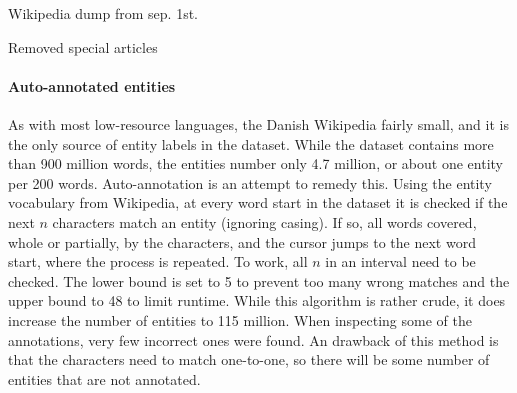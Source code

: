 \documentclass[10pt, a4paper]{article}
\begin{document}
Wikipedia dump from sep. 1st.

Removed special articles

\paragraph{Auto-annotated entities}
As with most low-resource languages, the Danish Wikipedia fairly small, and it is the only source of entity labels in the dataset.
While the dataset contains more than 900 million words, the entities number only 4.7 million, or about one entity per 200 words.
Auto-annotation is an attempt to remedy this.
Using the entity vocabulary from Wikipedia, at every word start in the dataset it is checked if the next $ n $ characters match an entity (ignoring casing).
If so, all words covered, whole or partially, by the characters, and the cursor jumps to the next word start, where the process is repeated.
To work, all $ n $ in an interval need to be checked.
The lower bound is set to 5 to prevent too many wrong matches and the upper bound to 48 to limit runtime.
While this algorithm is rather crude, it does increase the number of entities to 115 million.
When inspecting some of the annotations, very few incorrect ones were found.
An drawback of this method is that the characters need to match one-to-one, so there will be some number of entities that are not annotated.
\end{document}
